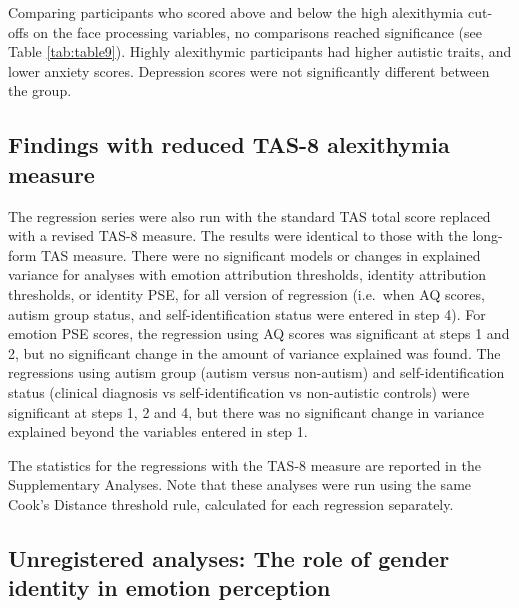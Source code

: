 \documentclass[
]{article}
\begin{document}
Comparing participants who scored above and below the high alexithymia cut-offs on the face processing variables, no comparisons reached significance (see Table \ref{tab:table9}). Highly alexithymic participants had higher autistic traits, and lower anxiety scores. Depression scores were not significantly different between the group.

\hypertarget{findings-with-reduced-tas-8-alexithymia-measure}{%
\subsection*{Findings with reduced TAS-8 alexithymia measure}\label{findings-with-reduced-tas-8-alexithymia-measure}}

The regression series were also run with the standard TAS total score replaced with a revised TAS-8 measure. The results were identical to those with the long-form TAS measure. There were no significant models or changes in explained variance for analyses with emotion attribution thresholds, identity attribution thresholds, or identity PSE, for all version of regression (i.e.~when AQ scores, autism group status, and self-identification status were entered in step 4). For emotion PSE scores, the regression using AQ scores was significant at steps 1 and 2, but no significant change in the amount of variance explained was found. The regressions using autism group (autism versus non-autism) and self-identification status (clinical diagnosis vs self-identification vs non-autistic controls) were significant at steps 1, 2 and 4, but there was no significant change in variance explained beyond the variables entered in step 1.

The statistics for the regressions with the TAS-8 measure are reported in the Supplementary Analyses. Note that these analyses were run using the same Cook's Distance threshold rule, calculated for each regression separately.

\hypertarget{unregistered-analyses-the-role-of-gender-identity-in-emotion-perception}{%
\subsection*{Unregistered analyses: The role of gender identity in emotion perception}\label{unregistered-analyses-the-role-of-gender-identity-in-emotion-perception}}
\end{document}
